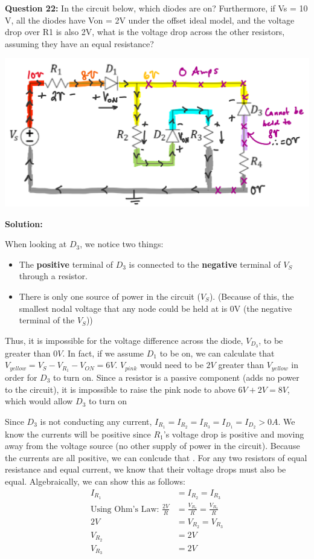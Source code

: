 \documentclass{article}
\begin{document}
\textbf{Question 22:} In the circuit below, which diodes are on? Furthermore, if Vs = 10 V, all the diodes have Von = 2V under the offset ideal model, and the voltage drop over R1 is also 2V, what is the voltage drop across the other resistors, assuming they have an equal resistance?

\begin{center}
    \includegraphics[width=0.75\linewidth]{figures/q22_sol.png}
\end{center}

\textbf{Solution:} 

When looking at $D_3$, we notice two things:
\begin{itemize}
    \item The \textbf{positive} terminal of $D_3$ is connected to the \textbf{negative} terminal of $V_S$ through a resistor.
    \item There is only one source of power in the circuit ($V_S$). (Because of this, the smallest nodal voltage that any node could be held at is 0V (the negative terminal of the $V_S$))
\end{itemize}

Thus, it is impossible for the voltage difference across the diode, $V_{D_3}$, to be greater than $0V$. In fact, if we assume $D_1$ to be on, we can calculate that $V_{yellow} = V_S - V_{R_1} - V_{ON} = 6V$. $V_{pink}$ would need to be $2V$ greater than $V_{yellow}$ in order for $D_3$ to turn on. Since a resistor is a passive component (adds no power to the circuit), it is impossible to raise the pink node to above $6V+2V = 8V$, which would allow $D_3$ to turn on 

Since $D_3$ is not conducting any current, $I_{R_1} = I_{R_2} = I_{R_3} = I_{D_1} = I_{D_2} > 0A $. 
We know the currents will be positive since $R_1$'s voltage drop is positive and moving away from the voltage source 
(no other supply of power in the circuit). 
Because the currents are all positive, we can conlcude that . 
For any two resistors of equal resistance and equal current, 
we know that their voltage drops must also be equal.
 Algebraically, we can show this as follows:
\begin{align*}
    I_{R_1} &= I_{R_2} = I_{R_3} \\
    \text{Using Ohm's Law: }\frac{2V}{R} &= \frac{V_{R_2}}{R} = \frac{V_{R_3}}{R} \\
    2V &= V_{R_2} = V_{R_3} \\ 
    V_{R_2} &= \boxed {2V } \\
    V_{R_3} &= \boxed {2V }
\end{align*} 
\end{document}
